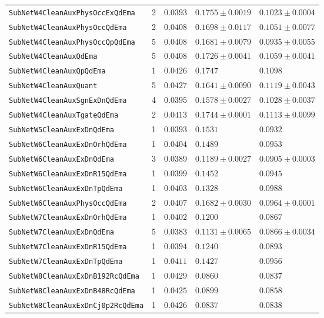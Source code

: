 \begin{longtable}{lrlll}
\texttt{SubNetW4CleanAuxPhysOccExQdEma} & 2 & $0.0393$ & $0.1755\pm0.0019$ & $0.1023\pm0.0004$\\
\texttt{SubNetW4CleanAuxPhysOccQdEma} & 2 & $0.0408$ & $0.1698\pm0.0117$ & $0.1051\pm0.0077$\\
\texttt{SubNetW4CleanAuxPhysOccQpQdEma} & 5 & $0.0408$ & $0.1681\pm0.0079$ & $0.0935\pm0.0055$\\
\texttt{SubNetW4CleanAuxQdEma} & 5 & $0.0408$ & $0.1726\pm0.0041$ & $0.1059\pm0.0041$\\
\texttt{SubNetW4CleanAuxQpQdEma} & 1 & $0.0426$ & $0.1747$ & $0.1098$\\
\texttt{SubNetW4CleanAuxQuant} & 5 & $0.0427$ & $0.1641\pm0.0090$ & $0.1119\pm0.0043$\\
\texttt{SubNetW4CleanAuxSgnExDnQdEma} & 4 & $0.0395$ & $0.1578\pm0.0027$ & $0.1028\pm0.0037$\\
\texttt{SubNetW4CleanAuxTgateQdEma} & 2 & $0.0413$ & $0.1744\pm0.0001$ & $0.1113\pm0.0099$\\
\texttt{SubNetW5CleanAuxExDnQdEma} & 1 & $0.0393$ & $0.1531$ & $0.0932$\\
\texttt{SubNetW6CleanAuxExDnOrhQdEma} & 1 & $0.0404$ & $0.1489$ & $0.0953$\\
\texttt{SubNetW6CleanAuxExDnQdEma} & 3 & $0.0389$ & $0.1189\pm0.0027$ & $0.0905\pm0.0003$\\
\texttt{SubNetW6CleanAuxExDnR15QdEma} & 1 & $0.0399$ & $0.1452$ & $0.0945$\\
\texttt{SubNetW6CleanAuxExDnTpQdEma} & 1 & $0.0403$ & $0.1328$ & $0.0988$\\
\texttt{SubNetW6CleanAuxPhysOccQdEma} & 2 & $0.0407$ & $0.1682\pm0.0030$ & $0.0964\pm0.0001$\\
\texttt{SubNetW7CleanAuxExDnOrhQdEma} & 1 & $0.0402$ & $0.1200$ & $0.0867$\\
\texttt{SubNetW7CleanAuxExDnQdEma} & 5 & $0.0383$ & $0.1131\pm0.0065$ & $0.0866\pm0.0034$\\
\texttt{SubNetW7CleanAuxExDnR15QdEma} & 1 & $0.0394$ & $0.1240$ & $0.0893$\\
\texttt{SubNetW7CleanAuxExDnTpQdEma} & 1 & $0.0411$ & $0.1427$ & $0.0956$\\
\texttt{SubNetW8CleanAuxExDnB192RcQdEma} & 1 & $0.0429$ & $0.0860$ & $0.0837$\\
\texttt{SubNetW8CleanAuxExDnB48RcQdEma} & 1 & $0.0425$ & $0.0899$ & $0.0858$\\
\texttt{SubNetW8CleanAuxExDnCj0p2RcQdEma} & 1 & $0.0426$ & $0.0837$ & $0.0838$\\

\end{longtable}
